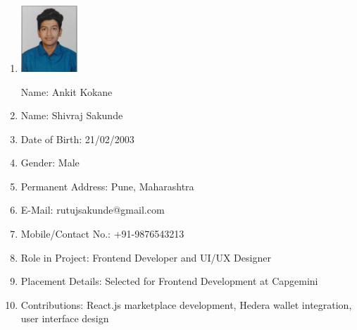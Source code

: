 \documentclass[oneside,a4paper,12pt]{book}
\begin{document}
\begin{appendices}
\newpage
\begin{enumerate}
\item \begin{flushright}\includegraphics[width=60pt]{rutuj-dp.jpeg}\end{flushright}
Name: Ankit Kokane
\item Name: Shivraj Sakunde
\item Date of Birth: 21/02/2003
\item Gender: Male
\item Permanent Address: Pune, Maharashtra
\item E-Mail: rutujsakunde@gmail.com
\item Mobile/Contact No.: +91-9876543213
\item Role in Project: Frontend Developer and UI/UX Designer
\item Placement Details: Selected for Frontend Development at Capgemini
\item Contributions: React.js marketplace development, Hedera wallet integration, user interface design
\end{enumerate}
\end{appendices}
\end{document}
